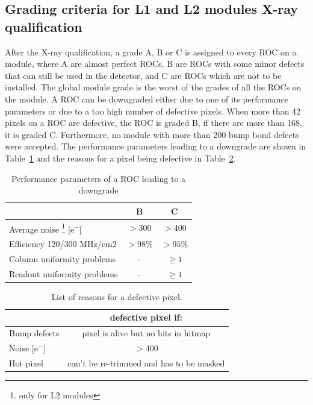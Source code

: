 \documentclass[a4paper,12pt,twoside]{article}
\begin{document}
\begin{appendices}
\section{Grading criteria for L1 and L2 modules X-ray qualification} \label{Grading}

After the X-ray qualification, a grade A, B or C is assigned to every ROC on a module, where A are almost perfect ROCs, B are ROCs with some minor defects that can still be used in the detector, and C are ROCs which are not to be installed. The global module grade is the worst of the grades of all the ROCs on the module. A ROC can be downgraded either due to one of its performance parameters or due to a too high number of defective pixels. When more than 42 pixels on a ROC are defective, the ROC is graded B, if there are more than 168, it is graded C. Furthermore, no module with more than 200 bump bond defects were accepted. The performance parameters leading to a downgrade are shown in Table~\ref{performanceparameters} and the reasons for a pixel being defective in Table~\ref{defectivepixel}.

\begin{table}[h!]
\centering
\caption{Performance parameters of a ROC leading to a downgrade}
\label{performanceparameters}
\begin{tabular}{@{}lcc@{}}
\toprule
                                             & B & C \\ \midrule
Average noise \footnote{only for L2 modules} [e$^{-}$] & $>300$   &  $>400$ \\
Efficiency 120/300 MHz/cm2   &  $>98\%$  & $>95\%$ \\
Column uniformity problems &  - & $\geq 1$ \\
Readout uniformity problems &  -  & $\geq 1$ \\ \bottomrule
\end{tabular}
\end{table}


\begin{table}[h!]
\centering
\caption{List of reasons for a defective pixel.}
\label{defectivepixel}
\begin{tabular}{@{}lc@{}}
\toprule
                                            & defective pixel if: \\ \midrule
Bump defects  &  pixel is alive but no hits in hitmap \\
Noise [e$^{-}$] & $>$400 \\
Hot pixel & can't be re-trimmed and has to be masked \\ \bottomrule
\end{tabular}
\end{table}


\end{appendices}
\end{document}
